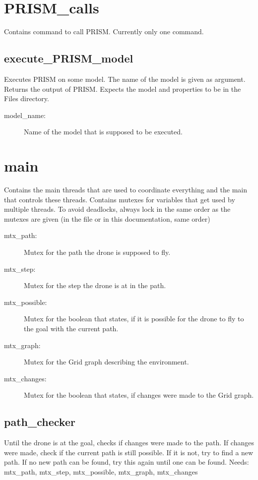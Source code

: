 \documentclass{article}
\begin{document}
\section{PRISM\_calls}
Contains command to call PRISM. Currently only one command.

\subsection{execute\_PRISM\_model}
Executes PRISM on some model. The name of the model is given as argument. Returns the output of PRISM. Expects the model and properties to be in the Files directory.

\begin{description}
    \item[model\_name:] Name of the model that is supposed to be executed.
\end{description}

\section{main}
Contains the main threads that are used to coordinate everything and the main that controls these threads. Contains mutexes for variables that get used by multiple threads. To avoid deadlocks, always lock in the same order as the mutexes are given (in the file or in this documentation, same order)

\begin{description}
    \item[mtx\_path:] Mutex for the path the drone is supposed to fly.
    \item[mtx\_step:] Mutex for the step the drone is at in the path.
    \item[mtx\_possible:] Mutex for the boolean that states, if it is possible for the drone to fly to the goal with the current path.
    \item[mtx\_graph:] Mutex for the Grid graph describing the environment.
    \item[mtx\_changes:] Mutex for the boolean that states, if changes were made to the Grid graph.
\end{description}

\subsection{path\_checker}
Until the drone is at the goal, checks if changes were made to the path. If changes were made, check if the current path is still possible. If it is not, try to find a new path. If no new path can be found, try this again until one can be found. Needs: mtx\_path, mtx\_step, mtx\_possible, mtx\_graph, mtx\_changes
\end{document}
